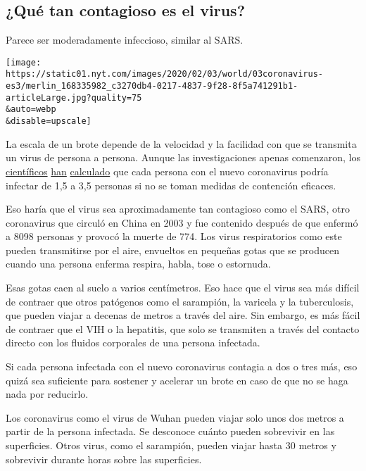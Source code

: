 \hypertarget{quuxe9-tan-contagioso-es-el-virus}{%
\subsection{¿Qué tan contagioso es el
virus?}\label{quuxe9-tan-contagioso-es-el-virus}}

Parece ser moderadamente infeccioso, similar al SARS.

\texttt{[image: https://static01.nyt.com/images/2020/02/03/world/03coronavirus-es3/merlin\_168335982\_c3270db4-0217-4837-9f28-8f5a741291b1-articleLarge.jpg?quality=75\\\&auto=webp\\\&disable=upscale]}

La escala de un brote depende de la velocidad y la facilidad con que se
transmita un virus de persona a persona. Aunque las investigaciones
apenas comenzaron, los
\href{https://www.nejm.org/doi/full/10.1056/NEJMoa2001316}{científicos}
\href{https://www.imperial.ac.uk/mrc-global-infectious-disease-analysis/news--wuhan-coronavirus/}{han}
\href{https://papers.ssrn.com/sol3/papers.cfm?abstract_id=3524675}{calculado}
que cada persona con el nuevo coronavirus podría infectar de 1,5 a 3,5
personas si no se toman medidas de contención eficaces.

Eso haría que el virus sea aproximadamente tan contagioso como el SARS,
otro coronavirus que circuló en China en 2003 y fue contenido después de
que enfermó a 8098 personas y provocó la muerte de 774. Los virus
respiratorios como este pueden transmitirse por el aire, envueltos en
pequeñas gotas que se producen cuando una persona enferma respira,
habla, tose o estornuda.

Esas gotas caen al suelo a varios centímetros. Eso hace que el virus sea
más difícil de contraer que otros patógenos como el sarampión, la
varicela y la tuberculosis, que pueden viajar a decenas de metros a
través del aire. Sin embargo, es más fácil de contraer que el VIH o la
hepatitis, que solo se transmiten a través del contacto directo con los
fluidos corporales de una persona infectada.

Si cada persona infectada con el nuevo coronavirus contagia a dos o tres
más, eso quizá sea suficiente para sostener y acelerar un brote en caso
de que no se haga nada por reducirlo.

Los coronavirus como el virus de Wuhan pueden viajar solo unos dos
metros a partir de la persona infectada. Se desconoce cuánto pueden
sobrevivir en las superficies. Otros virus, como el sarampión, pueden
viajar hasta 30 metros y sobrevivir durante horas sobre las superficies.

